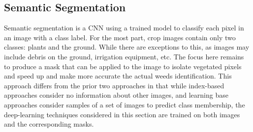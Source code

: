 \documentclass[letterpaper, notitlepage]{report}
\begin{document}
{%
%

\subsection{Semantic Segmentation}
Semantic segmentation is a \gls{CNN} using a trained model to classify each pixel in an image with a class label.  For the most part, crop images contain only two classes: plants and the ground. While there are exceptions to this,  as images may include debris on the ground, irrigation equipment, etc.  The focus here remains to produce a mask that can be applied to the image to isolate vegetated pixels and speed up and make more accurate the actual weeds identification. This approach differs from the prior two approaches in that while index-based approaches consider no information about other images, and learning base approaches consider samples of a set of images to predict class membership, the deep-learning techniques considered in this section are trained on both images and the corresponding masks.

}
\end{document}
